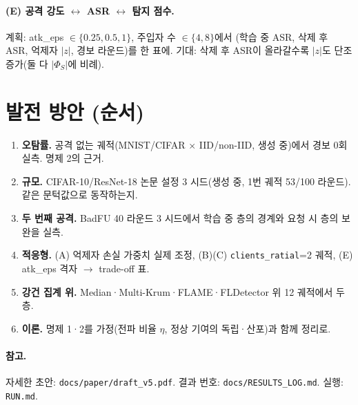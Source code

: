 \documentclass[10pt,a4paper]{article}
\begin{document}
\paragraph{(E) 공격 강도 $\leftrightarrow$ ASR $\leftrightarrow$ 탐지 점수.} 계획: atk\_eps $\in\{0.25,0.5,1\}$, 주입자 수 $\in\{4,8\}$에서 (학습 중 ASR, 삭제 후 ASR, 억제자 $|z|$, 경보 라운드)를 한 표에. 기대: 삭제 후 ASR이 올라갈수록 $|z|$도 단조 증가(둘 다 $|\Phi_S|$에 비례).

\section{발전 방안 (순서)}
\begin{enumerate}
\item \textbf{오탐률.} 공격 없는 궤적(MNIST/CIFAR $\times$ IID/non-IID, 생성 중)에서 경보 0회 실측. 명제 2의 근거.
\item \textbf{규모.} CIFAR-10/ResNet-18 논문 설정 3 시드(생성 중, 1번 궤적 53/100 라운드). 같은 문턱값으로 동작하는지.
\item \textbf{두 번째 공격.} BadFU 40 라운드 3 시드에서 학습 중 층의 경계와 요청 시 층의 보완을 실측.
\item \textbf{적응형.} (A) 억제자 손실 가중치 실제 조정, (B)(C) \texttt{clients\_ratial}=2 궤적, (E) atk\_eps 격자 $\to$ trade-off 표.
\item \textbf{강건 집계 위.} Median·Multi-Krum·FLAME·FLDetector 위 12 궤적에서 두 층.
\item \textbf{이론.} 명제 1·2를 가정(전파 비율 $\eta$, 정상 기여의 독립·산포)과 함께 정리로.
\end{enumerate}
\paragraph{참고.} 자세한 초안: \texttt{docs/paper/draft\_v5.pdf}. 결과 번호: \texttt{docs/RESULTS\_LOG.md}. 실행: \texttt{RUN.md}.
\end{document}
